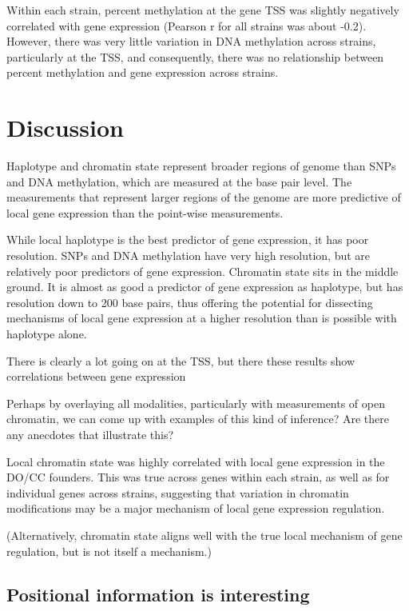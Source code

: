 \documentclass[10pt,letterpaper]{article}
\begin{document}
Within each strain, percent methylation at the gene TSS was slightly
negatively correlated with gene expression (Pearson r for all strains
was about -0.2). However, there was very little variation in DNA
methylation across strains, particularly at the TSS, and consequently,
there was no relationship between percent methylation and gene
expression across strains.

\hypertarget{discussion}{%
\section{Discussion}\label{discussion}}

Haplotype and chromatin state represent broader regions of genome than
SNPs and DNA methylation, which are measured at the base pair level. The
measurements that represent larger regions of the genome are more
predictive of local gene expression than the point-wise measurements.

While local haplotype is the best predictor of gene expression, it has
poor resolution. SNPs and DNA methylation have very high resolution, but
are relatively poor predictors of gene expression. Chromatin state sits
in the middle ground. It is almost as good a predictor of gene
expression as haplotype, but has resolution down to 200 base pairs, thus
offering the potential for dissecting mechanisms of local gene
expression at a higher resolution than is possible with haplotype alone.

There is clearly a lot going on at the TSS, but there these results show
correlations between gene expression

Perhaps by overlaying all modalities, particularly with measurements of
open chromatin, we can come up with examples of this kind of inference?
Are there any anecdotes that illustrate this?

Local chromatin state was highly correlated with local gene expression
in the DO/CC founders. This was true across genes within each strain, as
well as for individual genes across strains, suggesting that variation
in chromatin modifications may be a major mechanism of local gene
expression regulation.

(Alternatively, chromatin state aligns well with the true local
mechanism of gene regulation, but is not itself a mechanism.)

\hypertarget{positional-information-is-interesting}{%
\subsection{Positional information is
interesting}\label{positional-information-is-interesting}}
\end{document}

